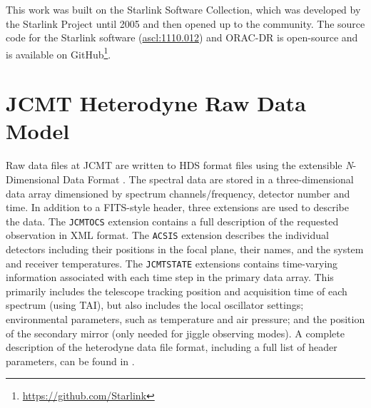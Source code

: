 \documentclass[a4paper,fleqn,usenatbib]{mnras}
\newcommand{\ascl}[1]{\href{http://www.ascl.net/#1}{ascl:#1}}
\begin{document}
This work was built on the Starlink Software Collection, which was
developed by the Starlink Project until 2005
\citep{1982QJRAS..23..485D,2005ASPC..347...22D,2008ASPC..394..650C}
and then opened up to the community. The source code for the Starlink
software (\ascl{1110.012}) and ORAC-DR is open-source and is
available on GitHub\footnote{\url{https://github.com/Starlink}}.

\appendix

\section{JCMT Heterodyne Raw Data Model}
\label{sec:rawdata}

Raw data files at JCMT are written to HDS format files
\citep[e.g.,][\ascl{1502.009}]{2015HDS} using the extensible \emph{N}-Dimensional
Data Format \citep[NDF;][\ascl{1411.023}]{2015NDF}. The spectral data are stored in a
three-dimensional data array dimensioned by spectrum channels/frequency, detector
number and time. In addition to a FITS-style header, three extensions
are used to describe the data. The \texttt{JCMTOCS} extension contains
a full description of the requested observation in XML format. The
\texttt{ACSIS} extension describes the individual detectors including
their positions in the focal plane, their names, and the system and
receiver temperatures. The \texttt{JCMTSTATE} extensions contains
time-varying information associated with each time step in the primary
data array. This primarily includes the telescope tracking position
and acquisition time of each spectrum (using TAI), but also includes
the local oscillator settings; environmental parameters, such as
temperature and air pressure; and the position of the secondary mirror
(only needed for jiggle observing modes).  A complete description of
the heterodyne data file format, including a full list of header
parameters, can be found in \citet{OCS_ICD_022}.





\bsp	%
\label{lastpage}
\end{document}
